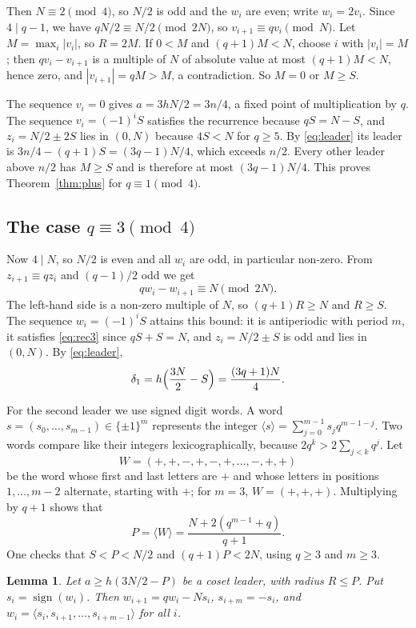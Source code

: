 \documentclass[11pt]{amsart}
\newtheorem{lemma}[theorem]{Lemma}
\theoremstyle{remark}
\begin{document}
Then $N\equiv2\pmod4$, so $N/2$ is odd and the $w_i$ are even; write $w_i=2v_i$.
Since $4\mid q-1$, we have $qN/2\equiv N/2\pmod{2N}$, so $v_{i+1}\equiv qv_i\pmod N$.
Let $M=\max_i|v_i|$, so $R=2M$.
If $0<M$ and $(q+1)M<N$, choose $i$ with $|v_i|=M$; then $qv_i-v_{i+1}$ is a multiple of $N$ of absolute value at most $(q+1)M<N$, hence zero, and $|v_{i+1}|=qM>M$, a contradiction.
So $M=0$ or $M\ge S$.

The sequence $v_i=0$ gives $a=3hN/2=3n/4$, a fixed point of multiplication by $q$.
The sequence $v_i=(-1)^iS$ satisfies the recurrence because $qS=N-S$, and $z_i=N/2\pm2S$ lies in $(0,N)$ because $4S<N$ for $q\ge5$.
By \eqref{eq:leader} its leader is $3n/4-(q+1)S=(3q-1)N/4$, which exceeds $n/2$.
Every other leader above $n/2$ has $M\ge S$ and is therefore at most $(3q-1)N/4$.
This proves Theorem~\ref{thm:plus} for $q\equiv1\pmod4$.

\subsection{The case $q\equiv3\pmod4$}

Now $4\mid N$, so $N/2$ is even and all $w_i$ are odd, in particular non-zero.
From $z_{i+1}\equiv qz_i$ and $(q-1)/2$ odd we get
\begin{equation}\label{eq:rec3}
qw_i-w_{i+1}\equiv N\pmod{2N}.
\end{equation}
The left-hand side is a non-zero multiple of $N$, so $(q+1)R\ge N$ and $R\ge S$.
The sequence $w_i=(-1)^iS$ attains this bound: it is antiperiodic with period $m$, it satisfies \eqref{eq:rec3} since $qS+S=N$, and $z_i=N/2\pm S$ is odd and lies in $(0,N)$.
By \eqref{eq:leader},
\[
\delta_1=h\Bigl(\frac{3N}2-S\Bigr)=\frac{(3q+1)N}{4}.
\]

For the second leader we use signed digit words.
A word $s=(s_0,\dots,s_{m-1})\in\{\pm1\}^m$ represents the integer $\langle s\rangle=\sum_{j=0}^{m-1}s_jq^{m-1-j}$.
Two words compare like their integers lexicographically, because $2q^k>2\sum_{j<k}q^j$.
Let
\[
W=(+,+,-,+,-,+,\dots,-,+,+)
\]
be the word whose first and last letters are $+$ and whose letters in positions $1,\dots,m-2$ alternate, starting with $+$; for $m=3$, $W=(+,+,+)$.
Multiplying by $q+1$ shows that
\[
P=\langle W\rangle=\frac{N+2(q^{m-1}+q)}{q+1}.
\]
One checks that $S<P<N/2$ and $(q+1)P<2N$, using $q\ge3$ and $m\ge3$.

\begin{lemma}\label{lem:signs}
Let $a\ge h(3N/2-P)$ be a coset leader, with radius $R\le P$.
Put $s_i=\operatorname{sign}(w_i)$.
Then $w_{i+1}=qw_i-Ns_i$, $s_{i+m}=-s_i$, and $w_i=\langle s_i,s_{i+1},\dots,s_{i+m-1}\rangle$ for all $i$.
\end{lemma}
\end{document}
